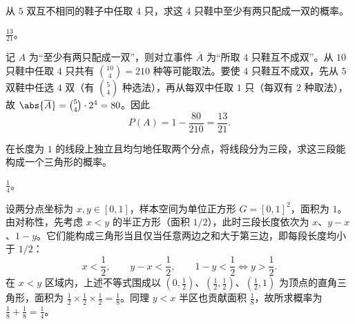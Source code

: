 \begin{exercise}[title={配对抽样计数},level=basic,points=6,tags={古典概型,对立事件}]
从 $5$ 双互不相同的鞋子中任取 $4$ 只，求这 $4$ 只鞋中至少有两只配成一双的概率。
\begin{answer}
$\frac{13}{21}$。
\end{answer}
\begin{solution}
记 $A$ 为“至少有两只配成一双”，则对立事件 $\overline{A}$ 为“所取 $4$ 只鞋互不成双”。从 $10$ 只鞋中任取 $4$ 只共有 $\binom{10}{4}=210$ 种等可能取法。要使 $4$ 只鞋互不成双，先从 $5$ 双鞋中任选 $4$ 双（有 $\binom{5}{4}$ 种选法），再从每双中任取 $1$ 只（每双有 $2$ 种取法），故 $\abs{\overline{A}}=\binom{5}{4}\cdot 2^4=80$。因此
\[
  P(A)=1-\frac{80}{210}=\frac{13}{21}.
\]
\end{solution}
\end{exercise}

\begin{exercise}[title={随机折断构成三角形},level=standard,points=8,tags={几何概型}]
在长度为 $1$ 的线段上独立且均匀地任取两个分点，将线段分为三段，求这三段能构成一个三角形的概率。
\begin{answer}
$\frac{1}{4}$。
\end{answer}
\begin{solution}
设两分点坐标为 $x,y\in[0,1]$，样本空间为单位正方形 $G=[0,1]^2$，面积为 $1$。由对称性，先考虑 $x<y$ 的半正方形（面积 $1/2$），此时三段长度依次为 $x$、$y-x$、$1-y$。它们能构成三角形当且仅当任意两边之和大于第三边，即每段长度均小于 $1/2$：
\[
  x<\frac{1}{2},\qquad y-x<\frac{1}{2},\qquad 1-y<\frac{1}{2}\iff y>\frac{1}{2}.
\]
在 $x<y$ 区域内，上述不等式围成以 $(0,\frac{1}{2})$、$(\frac{1}{2},\frac{1}{2})$、$(\frac{1}{2},1)$ 为顶点的直角三角形，面积为 $\frac{1}{2}\times\frac{1}{2}\times\frac{1}{2}=\frac{1}{8}$。同理 $y<x$ 半区也贡献面积 $\frac{1}{8}$，故所求概率为 $\frac{1}{8}+\frac{1}{8}=\frac{1}{4}$。
\end{solution}
\end{exercise}

